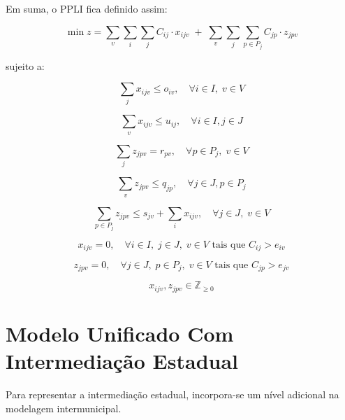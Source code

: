 Em suma, o PPLI fica definido assim:

\begin{equation*}
\min z = 
\sum_{v} \sum_{i} \sum_{j} C_{ij} \cdot x_{ijv}
\;+\;
\sum_{v} \sum_{j} \sum_{p \in P_j} C_{jp} \cdot z_{jpv}
\end{equation*}

sujeito a:

\begin{equation*}
\sum_{j} x_{ijv} \le o_{iv}, \quad \forall i \in I, \; v \in V
\end{equation*}

\begin{equation*}
\sum_{v} x_{ijv} \le u_{ij}, \quad \forall i \in I, j \in J
\end{equation*}

\begin{equation*}
\sum_{j} z_{jpv} = r_{pv}, \quad \forall p \in P_j, \; v \in V
\end{equation*}

\begin{equation*}
\sum_{v} z_{jpv} \le q_{jp}, \quad \forall j \in J, p \in P_j
\end{equation*}

\begin{equation*}
\sum_{p \in P_j} z_{jpv} \le 
s_{jv} +\sum_{i} x_{ijv}, \quad \forall j \in J, \; v \in V
\end{equation*}

\begin{equation*}
x_{ijv} = 0, \quad \forall i \in I, \; j \in J, \; v \in V \text{ tais que } C_{ij} > e_{iv}
\end{equation*}

\begin{equation*}
z_{jpv} = 0, \quad \forall j \in J, \; p \in P_j, \; v \in V \text{ tais que } C_{jp} > e_{jv}
\end{equation*}

\begin{equation*}
x_{ijv}, z_{jpv} \in \mathbb{Z}_{\geq 0}
\end{equation*}

\section{Modelo Unificado Com Intermediação Estadual}

Para representar a intermediação estadual, incorpora-se um nível adicional na modelagem intermunicipal.

